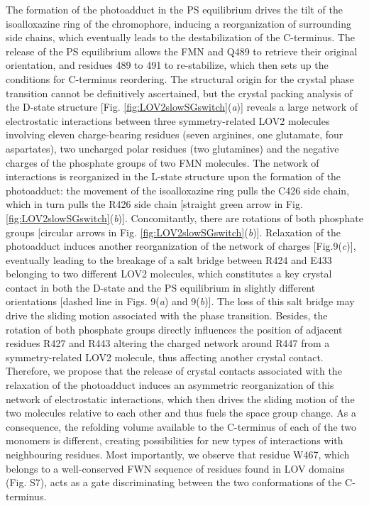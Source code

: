 The formation of the photoadduct in the PS equilibrium drives the tilt of the isoalloxazine ring of the chromophore, inducing a reorganization of surrounding side chains, which eventually leads to the destabilization of the C-terminus. The release of the PS equilibrium allows the FMN and Q489 to retrieve their original orientation, and residues 489 to 491 to re-stabilize, which then sets up the conditions for C-terminus reordering. The structural origin for the crystal phase transition cannot be definitively ascertained, but the crystal packing analysis of the D-state structure [Fig. \ref{fig:LOV2slowSGswitch}(\textit{a})] reveals a large network of electrostatic interactions between three symmetry-related LOV2 molecules involving eleven charge-bearing residues (seven arginines, one glutamate, four aspartates), two uncharged polar residues (two glutamines) and the negative charges of the phosphate groups of two FMN molecules. The network of interactions is reorganized in the L-state structure upon the formation of the photoadduct: the movement of the isoalloxazine ring pulls the C426 side chain, which in turn pulls the R426 side chain [straight green arrow in Fig. \ref{fig:LOV2slowSGswitch}(\textit{b})]. Concomitantly, there are rotations of both phosphate groups [circular arrows in Fig. \ref{fig:LOV2slowSGswitch}(\textit{b})]. Relaxation of the photoadduct induces another reorganization of the network of charges [Fig.9(\textit{c})], eventually leading to the breakage of a salt bridge between R424 and E433 belonging to two different LOV2 molecules, which constitutes a key crystal contact in both the D-state and the PS equilibrium in slightly different orientations [dashed line in Figs. 9(\textit{a}) and 9(\textit{b})]. The loss of this salt bridge may drive the sliding motion associated with the phase transition. Besides, the rotation of both phosphate groups directly influences the position of adjacent residues R427 and R443 altering the charged network around R447 from a symmetry-related LOV2 molecule, thus affecting another crystal contact. Therefore, we propose that the release of crystal contacts associated with the relaxation of the photoadduct induces an asymmetric reorganization of this network of electrostatic interactions, which then drives the sliding motion of the two molecules relative to each other and thus fuels the space group change. As a consequence, the refolding volume available to the C-terminus of each of the two monomers is different, creating possibilities for new types of interactions with neighbouring residues. Most importantly, we observe that residue W467, which belongs to a well-conserved FWN sequence of residues found in LOV domains (Fig. S7), acts as a gate discriminating between the two conformations of the C-terminus.
